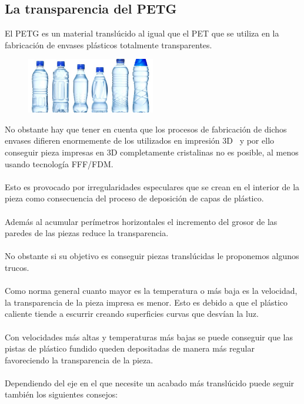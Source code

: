 \documentclass[11pt,a4paper]{article}
\begin{document}
	\subsection{La transparencia del PETG}El PETG es un material translúcido al igual que el PET que se utiliza en la fabricación de envases plásticos totalmente transparentes.
\begin{figure}[H]
\centering
\includegraphics[width=0.5\textwidth,cfbox=azul_marcos 1pt 0pt]{FOTOS/BOTELLASPET}
\end{figure}
No obstante hay que tener en cuenta que los procesos de fabricación de dichos envases difieren enormemente de los utilizados en impresión 3D  y por ello conseguir pieza impresas en 3D completamente cristalinas no es posible, al menos usando tecnología FFF/FDM.
\\\\
Esto es provocado por irregularidades especulares que se crean en el interior de la pieza como consecuencia del proceso de deposición de capas de plástico.
\\\\
Además al acumular perímetros horizontales el incremento del grosor de las paredes de las piezas reduce la transparencia.
\\\\
No obstante si su objetivo es conseguir piezas translúcidas le proponemos algunos trucos.
\\\\
Como norma general cuanto mayor es la temperatura o más baja es la velocidad, la transparencia de la pieza impresa es menor. Esto es debido a que el plástico caliente tiende a escurrir creando superficies curvas que desvían la luz.
\\\\
Con velocidades más altas y temperaturas más bajas se puede conseguir que las pistas de plástico fundido queden depositadas de manera más regular favoreciendo la transparencia de la pieza.
\\\\
Dependiendo del eje en el que necesite un acabado más translúcido puede seguir también los siguientes consejos:
\end{document}
